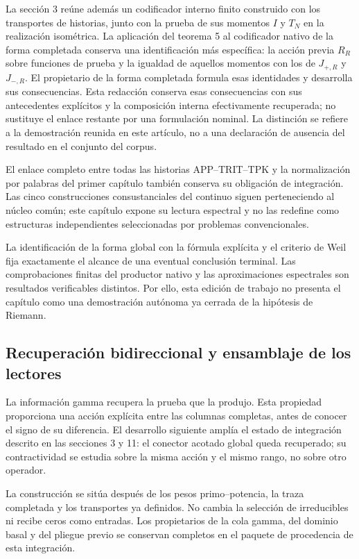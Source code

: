 La sección 3 reúne además un codificador interno finito construido con los transportes de historias, junto con la prueba de sus momentos \(I\) y \(T_N\) en la realización isométrica. La aplicación del teorema 5 al codificador nativo de la forma completada conserva una identificación más específica: la acción previa \(R_R\) sobre funciones de prueba y la igualdad de aquellos momentos con los de \(J_{+,R}\) y \(J_{-,R}\). El propietario de la forma completada formula esas identidades y desarrolla sus consecuencias. Esta redacción conserva esas consecuencias con sus antecedentes explícitos y la composición interna efectivamente recuperada; no sustituye el enlace restante por una formulación nominal. La distinción se refiere a la demostración reunida en este artículo, no a una declaración de ausencia del resultado en el conjunto del corpus.

El enlace completo entre todas las historias APP–TRIT–TPK y la normalización por palabras del primer capítulo también conserva su obligación de integración. Las cinco construcciones consustanciales del continuo siguen perteneciendo al núcleo común; este capítulo expone su lectura espectral y no las redefine como estructuras independientes seleccionadas por problemas convencionales.

La identificación de la forma global con la fórmula explícita y el criterio de Weil fija exactamente el alcance de una eventual conclusión terminal. Las comprobaciones finitas del productor nativo y las aproximaciones espectrales son resultados verificables distintos. Por ello, esta edición de trabajo no presenta el capítulo como una demostración autónoma ya cerrada de la hipótesis de Riemann.

\subsection{Recuperación bidireccional y ensamblaje de los lectores}
La información gamma recupera la prueba que la produjo. Esta propiedad proporciona una acción explícita entre las columnas completas, antes de conocer el signo de su diferencia. El desarrollo siguiente amplía el estado de integración descrito en las secciones 3 y 11: el conector acotado global queda recuperado; su contractividad se estudia sobre la misma acción y el mismo rango, no sobre otro operador.

La construcción se sitúa después de los pesos primo–potencia, la traza completada y los transportes ya definidos. No cambia la selección de irreducibles ni recibe ceros como entradas. Los propietarios de la cola gamma, del dominio basal y del pliegue previo se conservan completos en el paquete de procedencia de esta integración.


